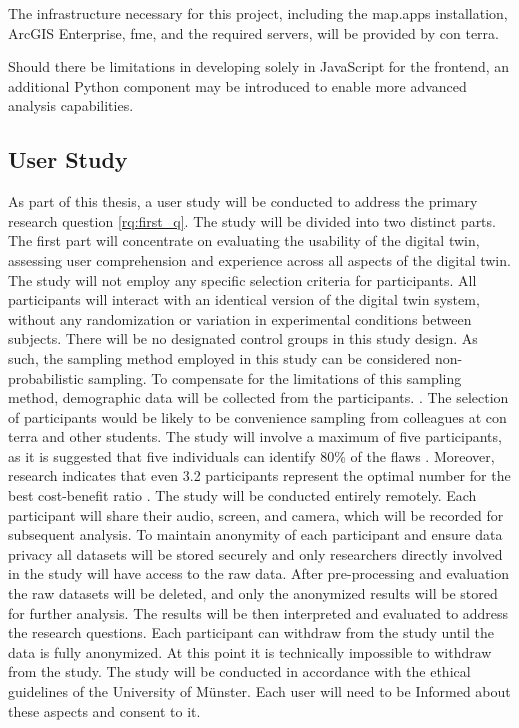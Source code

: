 \documentclass[11pt, titlepage, a4paper]{scrartcl}
\begin{document}
\begin{linenumbers}
    The infrastructure necessary for this project, including the map.apps installation, ArcGIS Enterprise, \gls{fme}, and the required servers, will be provided by con terra.

    Should there be limitations in developing solely in JavaScript for the frontend, an additional Python component may be introduced to enable more advanced analysis capabilities.


    \subsection{User Study}
    As part of this thesis, a user study will be conducted to address the primary research question \cref{rq:first_q}. The study will be divided into two distinct parts. The first part will concentrate on evaluating the usability of the digital twin, assessing user comprehension and experience across all aspects of the digital twin.
    The study will not employ any specific selection criteria for participants. All participants will interact with an identical version of the digital twin system, without any randomization or variation in experimental conditions between subjects. There will be no designated control groups in this study design. As such, the sampling method employed in this study can be considered non-probabilistic sampling. To compensate for the limitations of this sampling method, demographic data will be collected from the participants. \cite{lazarResearchMethodsHuman2017}. The selection of participants would be likely to be convenience sampling from colleagues at con terra and other students.
    The study will involve a maximum of five participants, as it is suggested that five individuals can identify 80\% of the flaws \cite{virziRefiningTestPhase1992}. Moreover, research indicates that even 3.2 participants represent the optimal number for the best cost-benefit ratio \cite{nielsenMathematicalModelFinding1993}.
    The study will be conducted entirely remotely. Each participant will share their audio, screen, and camera, which will be recorded for subsequent analysis.
    To maintain anonymity of each participant and ensure data privacy all datasets will be stored securely and only researchers directly involved in the study will have access to the raw data. After pre-processing and evaluation the raw datasets will be deleted, and only the anonymized results will be stored for further analysis. The results will be then interpreted and evaluated to address the research questions. Each participant can withdraw from the study until the data is fully anonymized. At this point it is technically impossible to withdraw from the study. The study will be conducted in accordance with the ethical guidelines of the University of Münster. Each user will need to be Informed about these aspects and consent to it. %


\end{linenumbers}
\end{document}
